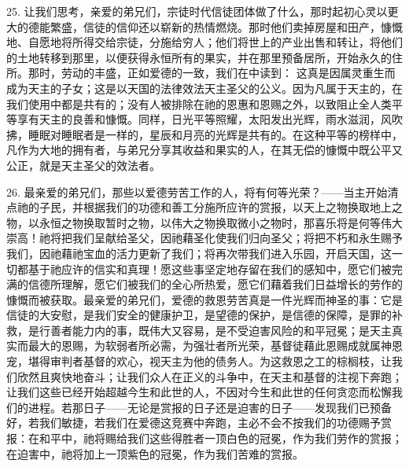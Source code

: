 25. 让我们思考，亲爱的弟兄们，宗徒时代信徒团体做了什么，那时起初心灵以更大的德能繁盛，信徒的信仰还以崭新的热情燃烧。那时他们卖掉房屋和田产，慷慨地、自愿地将所得交给宗徒，分施给穷人；他们将世上的产业出售和转让，将他们的土地转移到那里，以便获得永恒所有的果实，并在那里预备居所，开始永久的住所。那时，劳动的丰盛，正如爱德的一致，我们在中读到： 这真是因属灵重生而成为天主的子女；这是以天国的法律效法天主圣父的公义。因为凡属于天主的，在我们使用中都是共有的；没有人被排除在祂的恩惠和恩赐之外，以致阻止全人类平等享有天主的良善和慷慨。同样，日光平等照耀，太阳发出光辉，雨水滋润，风吹拂，睡眠对睡眠者是一样的，星辰和月亮的光辉是共有的。在这种平等的榜样中，凡作为大地的拥有者，与弟兄分享其收益和果实的人，在其无偿的慷慨中既公平又公正，就是天主圣父的效法者。\par

26. 最亲爱的弟兄们，那些以爱德劳苦工作的人，将有何等光荣？——当主开始清点祂的子民，并根据我们的功德和善工分施所应许的赏报，以天上之物换取地上之物，以永恒之物换取暂时之物，以伟大之物换取微小之物时，那喜乐将是何等伟大崇高！祂将把我们呈献给圣父，因祂藉圣化使我们归向圣父；将把不朽和永生赐予我们，因祂藉祂宝血的活力更新了我们；将再次带我们进入乐园，开启天国，这一切都基于祂应许的信实和真理！愿这些事坚定地存留在我们的感知中，愿它们被完满的信德所理解，愿它们被我们的全心所热爱，愿它们藉着我们日益增长的劳作的慷慨而被获取。最亲爱的弟兄们，爱德的救恩劳苦真是一件光辉而神圣的事：它是信徒的大安慰，是我们安全的健康护卫，是望德的保护，是信德的保障，是罪的补救，是行善者能力内的事，既伟大又容易，是不受迫害风险的和平冠冕；是天主真实而最大的恩赐，为软弱者所必需，为强壮者所光荣，基督徒藉此恩赐成就属神恩宠，堪得审判者基督的欢心，视天主为他的债务人。为这救恩之工的棕榈枝，让我们欣然且爽快地奋斗；让我们众人在正义的斗争中，在天主和基督的注视下奔跑；让我们这些已经开始超越今生和此世的人，不因对今生和此世的任何贪恋而松懈我们的进程。若那日子——无论是赏报的日子还是迫害的日子——发现我们已预备好，若我们敏捷，若我们在爱德这竞赛中奔跑，主必不会不按我们的功德赐予赏报：在和平中，祂将赐给我们这些得胜者一顶白色的冠冕，作为我们劳作的赏报；在迫害中，祂将加上一顶紫色的冠冕，作为我们苦难的赏报。\par


